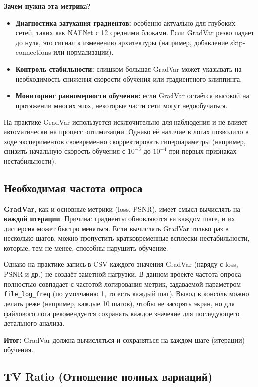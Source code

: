 \documentclass[12pt,a4paper]{article}
\begin{document}
\textbf{Зачем нужна эта метрика?}
\begin{itemize}
    \item \textbf{Диагностика затухания градиентов:} особенно актуально для глубоких сетей, таких как NAFNet с 12 средними блоками. Если GradVar резко падает до нуля, это сигнал к изменению архитектуры (например, добавление skip-connections или нормализации).
    \item \textbf{Контроль стабильности:} слишком большая GradVar может указывать на необходимость снижения скорости обучения или градиентного клиппинга.
    \item \textbf{Мониторинг равномерности обучения:} если GradVar остаётся высокой на протяжении многих эпох, некоторые части сети могут недообучаться.
\end{itemize}

На практике GradVar используется исключительно для наблюдения и не влияет автоматически на процесс оптимизации. Однако её наличие в логах позволило в ходе экспериментов своевременно скорректировать гиперпараметры (например, снизить начальную скорость обучения с \(10^{-3}\) до \(10^{-4}\) при первых признаках нестабильности).

\subsection{Необходимая частота опроса}

\textbf{GradVar}, как и основные метрики (loss, PSNR), имеет смысл вычислять на \textbf{каждой итерации}. Причина: градиенты обновляются на каждом шаге, и их дисперсия может быстро меняться. Если вычислять GradVar только раз в несколько шагов, можно пропустить кратковременные всплески нестабильности, которые, тем не менее, способны нарушить обучение.

Однако на практике запись в CSV каждого значения GradVar (наряду с loss, PSNR и др.) не создаёт заметной нагрузки. В данном проекте частота опроса полностью совпадает с частотой логирования метрик, задаваемой параметром \texttt{file\_log\_freq} (по умолчанию 1, то есть каждый шаг). Вывод в консоль можно делать реже (например, каждые 10 шагов), чтобы не засорять экран, но для файлового лога рекомендуется сохранять каждое значение для последующего детального анализа.

\textbf{Итог:} GradVar должна вычисляться и сохраняться на каждом шаге (итерации) обучения.

\subsection{TV Ratio (Отношение полных вариаций)}
\end{document}
